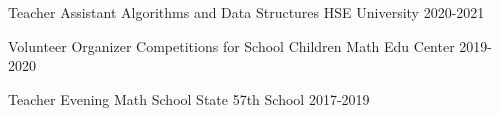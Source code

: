 

\begin{cvhonors}

  \cvhonor
    {Teacher Assistant} %
    {Algorithms and Data Structures} %
    {HSE University} %
    {2020-2021} %
    
  \cvhonor
    {Volunteer Organizer} %
    {Competitions for School Children} %
    {Math Edu Center} %
    {2019-2020} %

  \cvhonor
    {Teacher} %
    {Evening Math School} %
    {State 57th School} %
    {2017-2019} %

\end{cvhonors}

